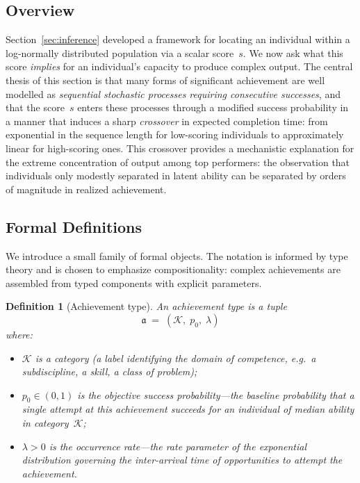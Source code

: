 \documentclass{article}
\newtheorem{definition}{Definition}
\begin{document}
\subsection{Overview}\label{ssec:overview-s2}

Section~\ref{sec:inference} developed a framework for locating an
individual within a log-normally distributed population via a scalar
score~$s$. We now ask what this score \emph{implies} for an individual's
capacity to produce complex output. The central thesis of this section is
that many forms of significant achievement are well modelled as
\emph{sequential stochastic processes requiring consecutive successes}, and
that the score~$s$ enters these processes through a modified success
probability in a manner that induces a sharp \emph{crossover} in
expected completion time: from exponential in the sequence length for
low-scoring individuals to approximately linear for high-scoring ones.
This crossover provides a mechanistic explanation for the extreme
concentration of output among top performers: the observation that
individuals only modestly separated in latent ability can be separated by
orders of magnitude in realized achievement.

\subsection{Formal Definitions}\label{ssec:defs}

We introduce a small family of formal objects. The notation is informed by
type theory and is chosen to emphasize compositionality: complex
achievements are assembled from typed components with explicit parameters.

\begin{definition}[Achievement type]\label{def:achievement}
An \emph{achievement type} is a tuple
\[
  \mathfrak{a} \;=\; (\mathcal{K},\; p_0,\; \lambda)
\]
where:
\begin{itemize}
  \item $\mathcal{K}$ is a \emph{category} (a label identifying the domain
        of competence, e.g.\ a subdiscipline, a skill, a class of problem);
  \item $p_0 \in (0,1)$ is the \emph{objective success probability}---the
        baseline probability that a single attempt at this achievement
        succeeds for an individual of median ability in category~$\mathcal{K}$;
  \item $\lambda > 0$ is the \emph{occurrence rate}---the rate parameter of
        the exponential distribution governing the inter-arrival time of
        opportunities to attempt the achievement.
\end{itemize}
\end{definition}
\end{document}
